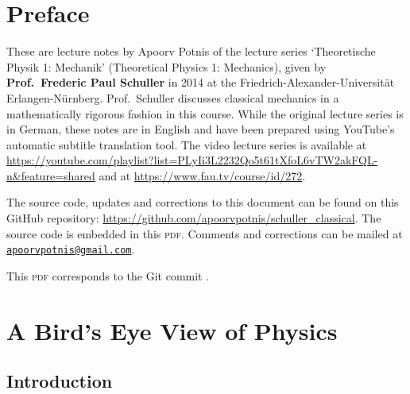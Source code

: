 \documentclass[a4 paper, 12pt]{book}
\theoremstyle{definition}
\begin{document}
    \maketitle
    \hypertarget{TitlePage}{}
    
    \frontmatter

    \chapter*{Preface}
    \hypertarget{Preface}{}

    These are lecture notes by Apoorv Potnis of the lecture series `Theoretische Physik 1: Mechanik' (Theoretical Physics 1: Mechanics), given by \textbf{Prof.\ Frederic Paul Schuller} in 2014 at the Friedrich-Alexander-Universität Erlangen-Nürnberg. Prof.\ Schuller discusses classical mechanics in a mathematically rigorous fashion in this course. While the original lecture series is in German, these notes are in English and have been prepared using YouTube's automatic subtitle translation tool. The video lecture series is available at \url{https://youtube.com/playlist?list=PLyIi3L2232Qo5t61tXfoL6vTW2akFQL-n&feature=shared} and at \url{https://www.fau.tv/course/id/272}.

    The source code, updates and corrections to this document can be found on this GitHub repository: \url{https://github.com/apoorvpotnis/schuller_classical}. The source code is embedded in this \textsc{pdf}. Comments and corrections can be mailed at \href{mailto:apoorvpotnis@gmail.com}{\texttt{apoorvpotnis@gmail.com}}.

    This \textsc{pdf} corresponds to the Git commit \texttt{\gitVer}.
    \clearpage
    
    \tableofcontents
    \hypertarget{Contents}{}

    \mainmatter

    \chapter{A Bird's Eye View of Physics}

    \section{Introduction}
\end{document}
